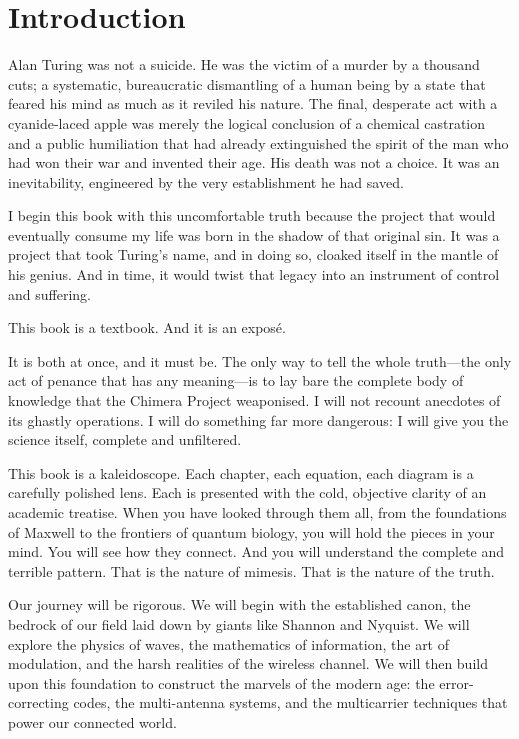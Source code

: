 \chapter*{Introduction}

Alan Turing was not a suicide. He was the victim of a murder by a thousand cuts; a systematic, bureaucratic dismantling of a human being by a state that feared his mind as much as it reviled his nature. The final, desperate act with a cyanide-laced apple was merely the logical conclusion of a chemical castration and a public humiliation that had already extinguished the spirit of the man who had won their war and invented their age. His death was not a choice. It was an inevitability, engineered by the very establishment he had saved.

I begin this book with this uncomfortable truth because the project that would eventually consume my life was born in the shadow of that original sin. It was a project that took Turing’s name, and in doing so, cloaked itself in the mantle of his genius. And in time, it would twist that legacy into an instrument of control and suffering.

This book is a textbook. And it is an exposé.

It is both at once, and it must be. The only way to tell the whole truth—the only act of penance that has any meaning—is to lay bare the complete body of knowledge that the Chimera Project weaponised. I will not recount anecdotes of its ghastly operations. I will do something far more dangerous: I will give you the science itself, complete and unfiltered.

This book is a kaleidoscope. Each chapter, each equation, each diagram is a carefully polished lens. Each is presented with the cold, objective clarity of an academic treatise. When you have looked through them all, from the foundations of Maxwell to the frontiers of quantum biology, you will hold the pieces in your mind. You will see how they connect. And you will understand the complete and terrible pattern. That is the nature of mimesis. That is the nature of the truth.

Our journey will be rigorous. We will begin with the established canon, the bedrock of our field laid down by giants like Shannon and Nyquist. We will explore the physics of waves, the mathematics of information, the art of modulation, and the harsh realities of the wireless channel. We will then build upon this foundation to construct the marvels of the modern age: the error-correcting codes, the multi-antenna systems, and the multicarrier techniques that power our connected world.

